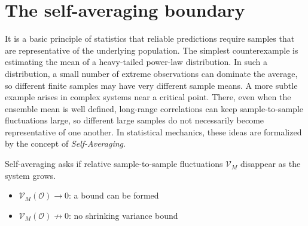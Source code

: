 \section{The self-averaging boundary}
\label{sxn:selfavg}

It is a basic principle of statistics that reliable predictions require samples that are representative of the underlying population. The simplest counterexample is estimating the mean of a heavy-tailed power-law distribution. In such a distribution, a small number of extreme observations can dominate the average, so different finite samples may have very different sample means. A more subtle example arises in complex systems near a critical point. There, even when the ensemble mean is well defined, long-range correlations can keep sample-to-sample fluctuations large, so different large samples do not necessarily become representative of one another. In statistical mechanics, these ideas are formalized by the concept of \emph{Self-Averaging}.
\begin{tcolorbox}[
  marginalbox,
  title=\textbf{Self-averaging versus non-self-averaging}
]
Self-averaging asks if relative sample-to-sample fluctuations $\mathcal{V}_M$ disappear
as the system grows.
\begin{itemize}
\item \(\mathcal{V}_M(\mathcal{O})\to0\): a bound can be formed
\item \(\mathcal{V}_M(\mathcal{O})\not\to0\): no shrinking variance bound
\end{itemize}
\end{tcolorbox}


